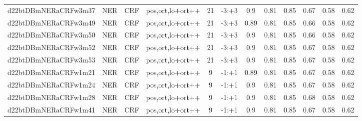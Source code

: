 \documentclass[a4paper]{article}
\begin{document}
\begin{landscape}
\begin{center}
\begin{tabular}{ |c|c|c|c|c|c|c|c|c|c|c|c|}
 	
 
 	
 		
 		\small{ d22btDBmNERaCRFw3m37 } & NER & CRF & pos,ort,lo+ort++  &  21 &  -3:+3  &  0.9 & 0.81 & 0.85  &  0.67 & 0.58 & 0.62 \\
 		

 	
 
 	
 		
 		\small{ d22btDBmNERaCRFw3m49 } & NER & CRF & pos,ort,lo+ort++  &  21 &  -3:+3  &  0.89 & 0.81 & 0.85  &  0.66 & 0.58 & 0.62 \\
 		

 	
 
 	
 		
 		\small{ d22btDBmNERaCRFw3m50 } & NER & CRF & pos,ort,lo+ort++  &  21 &  -3:+3  &  0.9 & 0.81 & 0.85  &  0.66 & 0.58 & 0.62 \\
 		

 	
 
 	
 		
 		\small{ d22btDBmNERaCRFw3m52 } & NER & CRF & pos,ort,lo+ort++  &  21 &  -3:+3  &  0.9 & 0.81 & 0.85  &  0.67 & 0.58 & 0.62 \\
 		

 	
 
 	
 		
 		\small{ d22btDBmNERaCRFw3m53 } & NER & CRF & pos,ort,lo+ort++  &  21 &  -3:+3  &  0.9 & 0.81 & 0.85  &  0.67 & 0.58 & 0.62 \\
 		

 	
 
 	
 		
 		\small{ d22btDBmNERaCRFw1m21 } & NER & CRF & pos,ort,lo+ort++  &  9 &  -1:+1  &  0.89 & 0.81 & 0.85  &  0.67 & 0.58 & 0.62 \\
 		

 	
 
 	
 		
 		\small{ d22btDBmNERaCRFw1m24 } & NER & CRF & pos,ort,lo+ort++  &  9 &  -1:+1  &  0.9 & 0.81 & 0.85  &  0.67 & 0.58 & 0.62 \\
 		

 	
 
 	
 		
 		\small{ d22btDBmNERaCRFw1m28 } & NER & CRF & pos,ort,lo+ort++  &  9 &  -1:+1  &  0.9 & 0.81 & 0.85  &  0.68 & 0.58 & 0.62 \\
 		

 	
 
 	
 		
 		\small{ d22btDBmNERaCRFw1m41 } & NER & CRF & pos,ort,lo+ort++  &  9 &  -1:+1  &  0.9 & 0.81 & 0.85  &  0.67 & 0.58 & 0.62 \\
 		


\end{tabular}
\end{center}
\end{landscape}
\end{document}
